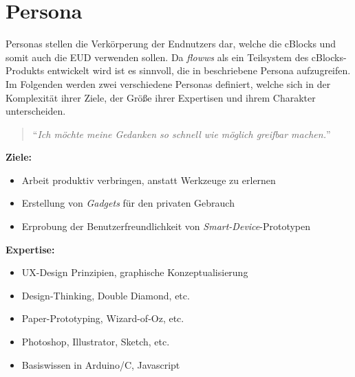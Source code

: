 \section{Persona}\label{sec:persona}
Personas stellen die Verkörperung der Endnutzers dar, welche die cBlocks und somit auch die \ac{EUD} verwenden sollen. Da \textit{flowws} als ein Teilsystem des cBlocks-Produkts entwickelt wird ist es sinnvoll, die in \cite{weckbach2018cblocks} beschriebene Persona aufzugreifen. Im Folgenden werden zwei verschiedene Personas definiert, welche sich in der Komplexität ihrer Ziele, der Größe ihrer Expertisen und ihrem Charakter unterscheiden.

\begin{tcolorbox}[title={Persona \#1, Laura, 24, UX-Designerin},toptitle=3mm,bottomtitle=3mm, bicolor ,sidebyside,righthand width=3cm, sharp corners, boxrule=.4pt, colback=green!5, colbacklower=green!5, label=personalaura]
\begin{quote}
    "`\textit{Ich möchte meine Gedanken so schnell wie möglich greifbar machen.}"'
\end{quote}
    \textbf{Ziele:} 
    \begin{itemize}
        \item Arbeit produktiv verbringen, anstatt Werkzeuge zu erlernen
        \item Erstellung von \textit{Gadgets} für den privaten Gebrauch
        \item Erprobung der Benutzerfreundlichkeit von \textit{Smart-Device}-Prototypen
    \end{itemize}
    \textbf{Expertise:} 
    \begin{itemize}
        \item \ac{UX}-Design Prinzipien, graphische Konzeptualisierung
        \item Design-Thinking, Double Diamond, etc.
        \item Paper-Prototyping, Wizard-of-Oz, etc.
        \item Photoshop, Illustrator, Sketch, etc.
        \item Basiswissen in Arduino/C, Javascript
    \end{itemize}
    
    \tcblower
    

\end{tcolorbox}
